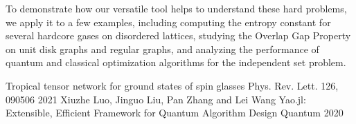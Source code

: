 \documentclass[11pt, a4paper]{awesome-cv}
\begin{document}
\begin{cventries}
{\begin{cvitems}
{          To demonstrate how our versatile tool helps to understand these hard problems, we apply it to a few examples, including computing the entropy constant for several hardcore gases on disordered lattices, studying the Overlap Gap Property on unit disk graphs and regular graphs, and analyzing the performance of quantum and classical optimization algorithms for the independent set problem.}
      \end{cvitems}
    }
  {Tropical tensor network for ground states of spin glasses}
  {Phys. Rev. Lett. 126, 090506}
  {2021}
  {
  }
  \cventry
    {Xiuzhe Luo, Jinguo Liu, Pan Zhang and Lei Wang} %
    {Yao.jl: Extensible, Efficient Framework for Quantum Algorithm Design} %
    {Quantum} %
    {2020} %
    {
    }
\end{cventries}
\end{document}
